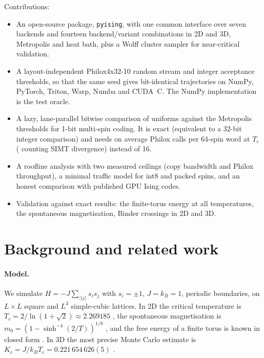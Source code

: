 \documentclass[11pt]{article}
\begin{document}
Contributions:
\begin{itemize}
  \item An open-source package, \texttt{pyising}, with one common interface over seven backends
        and fourteen backend/variant combinations in 2D and 3D, Metropolis and heat bath, plus a
        Wolff cluster sampler \citep{Wolff1989} for near-critical validation.
  \item A layout-independent Philox4x32-10 \citep{Salmon2011} random stream and integer
        acceptance thresholds, so that the same seed gives bit-identical trajectories on NumPy,
        PyTorch, Triton, Warp, Numba and CUDA~C. The NumPy implementation is the test oracle.
  \item A lazy, lane-parallel bitwise comparison of uniforms against the Metropolis thresholds
        for 1-bit multi-spin coding. It is exact (equivalent to a 32-bit integer comparison)
        and needs on average \callsPerWord{} Philox calls per 64-spin word at $T_c$
        (\callsPerWordWarp{} counting SIMT divergence) instead of 16.
  \item A roofline analysis with two measured ceilings (copy bandwidth and Philox throughput),
        a minimal traffic model for int8 and packed spins, and an honest comparison with
        published GPU Ising codes.
  \item Validation against exact results: the finite-torus energy at all temperatures, the
        spontaneous magnetisation, Binder crossings in 2D and 3D.
\end{itemize}

\section{Background and related work}

\paragraph{Model.} We simulate $H=-J\sum_{\langle ij\rangle}s_is_j$ with $s_i=\pm1$, $J=k_B=1$,
periodic boundaries, on $L\times L$ square and $L^3$ simple-cubic lattices. In 2D the critical
temperature is $T_c=2/\ln(1+\sqrt2)\approx2.269185$ \citep{Onsager1944}, the spontaneous
magnetisation is $m_0=(1-\sinh^{-4}(2/T))^{1/8}$ \citep{Yang1952}, and the free energy of a
finite torus is known in closed form \citep{FerdinandFisher1969}. In 3D the most precise Monte
Carlo estimate is $K_c=J/k_BT_c=0.221\,654\,626(5)$ \citep{Ferrenberg2018}.
\end{document}
